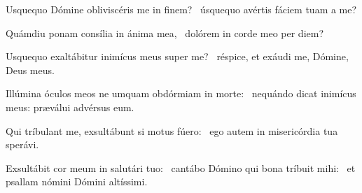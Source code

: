 \item Usquequo Dómine obliviscéris me in finem?~\psstar{} úsquequo avértis fáciem tuam a me?

\item Quámdiu ponam consília in ánima mea,~\psstar{} dolórem in corde meo per diem?

\item Usquequo exaltábitur inimícus meus super me?~\psstar{} réspice, et exáudi me, Dómine, Deus meus.

\item Illúmina óculos meos ne umquam obdórmiam in morte:~\psstar{} nequándo dicat inimícus meus: præválui advérsus eum.

\item Qui tríbulant me, exsultábunt si motus fúero:~\psstar{} ego autem in misericórdia tua sperávi.

\item Exsultábit cor meum in salutári tuo:~\pscross{} cantábo Dómino qui bona tríbuit mihi:~\psstar{} et psallam nómini Dómini altíssimi.

